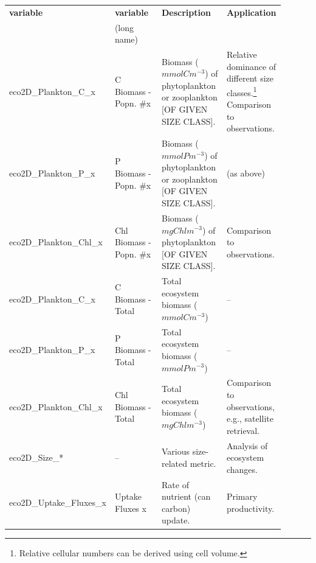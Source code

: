 \begin{table}[htp!]
\begin{tabular}{p{0.25\linewidth} p{0.20\linewidth} p{0.25\linewidth} p{0.20\linewidth}}
\toprule
\textbf{variable} & \textbf{variable} & \textbf{Description} & \textbf{Application}\\
 & (long name) & &\\
\midrule

\textsf{\footnotesize eco2D\_Plankton\_C\_x} & \textsf{\footnotesize C Biomass - Popn. \#x} & 
\small{Biomass ($mmol C m^{-3}$) of phytoplankton or zooplankton [OF GIVEN SIZE CLASS].} & \small{Relative dominance of different size classes.\footnote{Relative cellular numbers can be derived using cell volume.} Comparison to observations.}\\
\textsf{\footnotesize eco2D\_Plankton\_P\_x} & \textsf{\footnotesize P Biomass - Popn. \#x} & 
\small{Biomass ($mmol P m^{-3}$) of phytoplankton or zooplankton [OF GIVEN SIZE CLASS].} & \small{(as above)}\\
\textsf{\footnotesize eco2D\_Plankton\_Chl\_x} & \textsf{\footnotesize Chl Biomass - Popn. \#x} & 
\small{Biomass ($mg Chl m^{-3}$) of phytoplankton [OF GIVEN SIZE CLASS].} & \small{Comparison to observations.}\\

\midrule

\textsf{\footnotesize eco2D\_Plankton\_C\_x} & \textsf{\footnotesize C Biomass - Total} & 
\small{Total ecosystem biomass ($mmol C m^{-3}$)} & \small{--}\\
\textsf{\footnotesize eco2D\_Plankton\_P\_x} & \textsf{\footnotesize P Biomass - Total} & 
\small{Total ecosystem biomass ($mmol P m^{-3}$)} & \small{--}\\
\textsf{\footnotesize eco2D\_Plankton\_Chl\_x} & \textsf{\footnotesize Chl Biomass - Total} & 
\small{Total ecosystem biomass ($mg Chl m^{-3}$)} & \small{Comparison to observations, e.g., satellite retrieval.}\\

\midrule

\textsf{\footnotesize eco2D\_Size\_*} & \textsf{\footnotesize --} & 
\small{Various size-related metric.} & \small{Analysis of ecosystem changes.}\\

\midrule

\textsf{\footnotesize eco2D\_Uptake\_Fluxes\_x} & \textsf{\footnotesize Uptake Fluxes x} & 
\small{Rate of nutrient (can carbon) update.} & \small{Primary productivity.}\\


\end{tabular}
\end{table}
